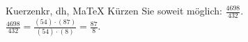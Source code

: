 \begin{MAufgabe}{Kuerzen}{kr, dh, MaTeX}
K\"urzen Sie soweit m\"oglich: $\frac{4698}{432}$.\\ 
\ifLsg\MLoesung
\quad $\frac{4698}{432}=\frac{(54)\cdot(87)}{(54)\cdot(8)}=\frac{87}{8}$.\else\relax\fi
 \end{MAufgabe}